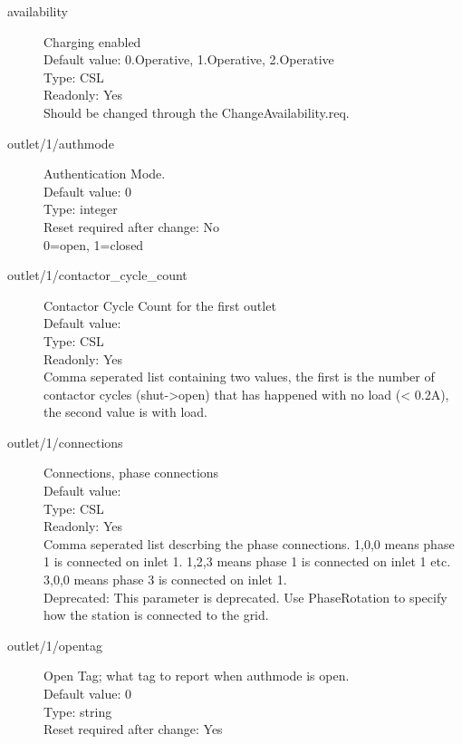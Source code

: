 \begin{description}
\item[availability] Charging enabled\\
  Default value: 0.Operative, 1.Operative, 2.Operative\\
  Type: CSL\\
  Readonly: Yes\\
  Should be changed through the ChangeAvailability.req.\\

\item[outlet/1/authmode] Authentication Mode.\\
  Default value: 0\\
  Type: integer\\
  Reset required after change: No\\
  0=open, 1=closed\\

\item[outlet/1/contactor\_cycle\_count] Contactor Cycle Count for the first outlet\\
  Default value: \\
  Type: CSL\\
  Readonly: Yes\\
  Comma seperated list containing two values, the first is the number of contactor cycles (shut->open) that has happened with no load (< 0.2A), the second value is with load.\\

\item[outlet/1/connections] Connections, phase connections\\
  Default value: \\
  Type: CSL\\
  Readonly: Yes\\
  Comma seperated list descrbing the phase connections. 1,0,0 means phase 1 is connected on inlet 1. 1,2,3 means phase 1 is connected on inlet 1 etc. 3,0,0 means phase 3 is connected on inlet 1.\\
  Deprecated: This parameter is deprecated. Use PhaseRotation to specify how the station is connected to the grid.\\

\item[outlet/1/opentag] Open Tag; what tag to report when authmode is open.\\
  Default value: 0\\
  Type: string\\
  Reset required after change: Yes\\


\end{description}
